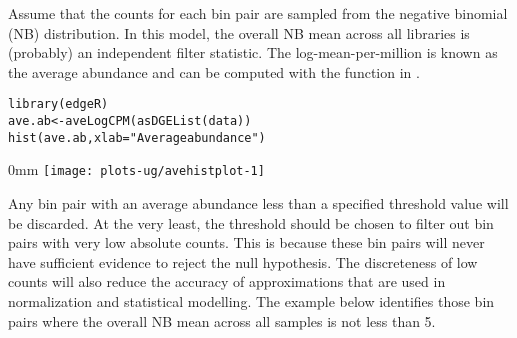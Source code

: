 \documentclass{report}\usepackage[]{graphicx}\usepackage[usenames,dvipsnames]{color}
\makeatletter
\def\maxwidth{ %
  \ifdim\Gin@nat@width>\linewidth
    \linewidth
  \else
    \Gin@nat@width
  \fi
}
\newcommand{\hlnum}[1]{\textcolor[rgb]{0.816,0.125,0.439}{#1}}%
\newcommand{\hlstr}[1]{\textcolor[rgb]{0.251,0.627,0.251}{#1}}%
\newcommand{\hlopt}[1]{\textcolor[rgb]{0,0,0}{#1}}%
\newcommand{\hlstd}[1]{\textcolor[rgb]{0.251,0.251,0.251}{#1}}%
\newcommand{\hlkwb}[1]{\textcolor[rgb]{0,0,0}{#1}}%
\newcommand{\hlkwc}[1]{\textcolor[rgb]{0.251,0.251,0.251}{#1}}%
\newcommand{\hlkwd}[1]{\textcolor[rgb]{0.878,0.439,0.125}{#1}}%
\newenvironment{knitrout}{}{} %
\makeatother
\begin{document}
Assume that the counts for each bin pair are sampled from the negative binomial (NB) distribution.
In this model, the overall NB mean across all libraries is (probably) an independent filter statistic.
The log-mean-per-million is known as the average abundance and can be computed with the  function in  \cite{mccarthy2012glm}.

\begin{knitrout}
\color{fgcolor}\begin{kframe}
\begin{alltt}
\hlkwd{library}\hlstd{(edgeR)}
\hlstd{ave.ab} \hlkwb{<-} \hlkwd{aveLogCPM}\hlstd{(}\hlkwd{asDGEList}\hlstd{(data))}
\hlkwd{hist}\hlstd{(ave.ab,} \hlkwc{xlab}\hlstd{=}\hlstr{"Average abundance"}\hlstd{)}
\end{alltt}
\end{kframe}\begin{adjustwidth}{\fltoffset}{0mm}
\texttt{[image: plots-ug/avehistplot-1]} \end{adjustwidth}
\end{knitrout}

Any bin pair with an average abundance less than a specified threshold value will be discarded.
At the very least, the threshold should be chosen to filter out bin pairs with very low absolute counts.
This is because these bin pairs will never have sufficient evidence to reject the null hypothesis.
The discreteness of low counts will also reduce the accuracy of approximations that are used in normalization and statistical modelling.
The example below identifies those bin pairs where the overall NB mean across all samples is not less than 5.

\begin{knitrout}
\color{fgcolor}
\end{knitrout}
\end{document}
